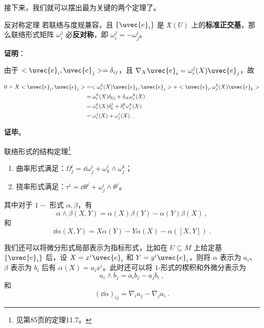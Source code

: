 接下来，我们就可以摆出最为关键的两个定理了。

\begin{theorem}{反对称定理}\label{the_ConFom_1}
若联络与度规兼容，且 $\{\uvec{e}_i\}$ 是 $\mathfrak{X}(U)$ 上的\textbf{标准正交基}，那么联络形式矩阵 $\omega^j_i$ 必\textbf{反对称}，即 $\omega^j_i=-\omega^i_j$。
\end{theorem}

\textbf{证明}：

由于 $<\uvec{e}_i, \uvec{e}_j>=\delta_{ij}$，且 $\nabla_X\uvec{e}_i=\omega^j_i(X)\uvec{e}_j$，故

\begin{equation}
\begin{aligned}
0=X<\uvec{e}_i, \uvec{e}_j>&=<\omega^k_i(X)\uvec{e}_k, \uvec{e}_j>+<\uvec{e}_i, \omega^k_j(X)\uvec{e}_k>\\
&=\omega^k_i(X)\delta_{kj}+\delta_{ik}\omega^k_j(X)\\
&=\omega^k_i(X)\delta_{k}^j+\delta_{i}^k\omega^k_j(X)\\
&=\omega^j_i(X)+\omega^i_j(X)~.
\end{aligned}
\end{equation}

\textbf{证毕}。



\begin{theorem}{联络形式的结构定理\footnote{见\cite{GTM275}第85页的定理11.7。}}\label{the_ConFom_2}
\begin{enumerate}
\item 曲率形式满足：$\Omega^i_j=\dd \omega^i_j+\omega^i_k\wedge\omega^k_j$；
\item 挠率形式满足：$\tau^i=\dd\theta^i+\omega^i_j\wedge\theta^j$。
\end{enumerate}

其中对于 $1-$ 形式 $\alpha, \beta$，有
\begin{equation}
\alpha\wedge \beta(X, Y)=\alpha(X)\beta(Y)-\alpha(Y)\beta(X)~,
\end{equation}
和
\begin{equation}
\dd \alpha(X, Y)=X\alpha(Y)-Y\alpha(X)-\alpha([X, Y])~.
\end{equation}

我们还可以将微分形式局部表示为指标形式，比如在 $U\subseteq M$ 上给定基 $\{\uvec{e}_i\}$ 后，设 $X=x^i\uvec{e}_i$ 和 $Y=y^i\uvec{e}_i$，则将 $\alpha$ 表示为 $a_i$、$\beta$ 表示为 $b_i$ 后有 $\alpha(X)=a_ix^i$。此时还可以将 $1$-形式的楔积和外微分表示为
\begin{equation}
a_i\wedge b_j=a_ib_j-a_jb_i~,
\end{equation}
和
\begin{equation}
(\dd \alpha)_{ij}=\nabla_{i}a_j-\nabla_{j}a_i~.
\end{equation}
\end{theorem}












